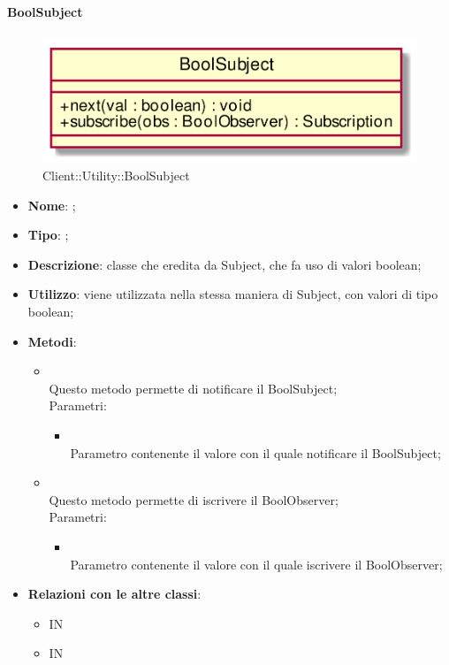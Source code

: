 \hypertarget{BoolSubject_label}{\paragraph{BoolSubject}}
\begin{figure}[h]
	\centering
	\includegraphics[width=\textwidth,height=\textheight,keepaspectratio]{images/ClassBoolSubject.png}
	\caption{Client::Utility::BoolSubject}
\end{figure}
\begin{itemize}
	\item \textbf{Nome}: ;
	\item \textbf{Tipo}: ;
	\item \textbf{Descrizione}: classe che eredita da Subject, che fa uso di valori boolean;
	\item \textbf{Utilizzo}: viene utilizzata nella stessa maniera di Subject, con valori di tipo boolean;
	\item \textbf{Metodi}:
	\begin{itemize}
		\item[]  \\
		Questo metodo permette di notificare il BoolSubject;\\
		Parametri:
		\begin{itemize}
			\item {} \\
			Parametro contenente il valore con il quale notificare il BoolSubject;
		\end{itemize}
		\item[]  \\
		Questo metodo permette di iscrivere il BoolObserver;\\
		Parametri:
		\begin{itemize}
			\item {} \\
			Parametro contenente il valore con il quale iscrivere il BoolObserver;
		\end{itemize}
	\end{itemize}
	\item \textbf{Relazioni con le altre classi}:
	\begin{itemize}
		\item IN \hyperlink{Player_label}{}
		\item IN \hyperlink{BoolObservable_label}{}
	\end{itemize}
\end{itemize}
\FloatBarrier

